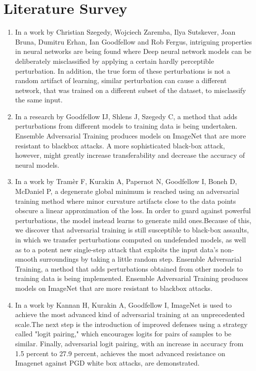 \documentclass[ 12pt,a4paper,twocolumn,fleqn]{article}
\begin{document}
\section{Literature Survey}
\begin{enumerate}
    \item In a work by Christian Szegedy, Wojciech Zaremba, Ilya Sutskever, Joan Bruna, Dumitru Erhan, Ian Goodfellow and Rob Fergus, intriguing properties in neural networks are being found where Deep neural network models can be deliberately misclassified by applying a certain hardly perceptible perturbation. In addition, the true form of these perturbations is not a random artifact of learning, similar perturbation can cause a different network, that was trained on a different subset of the dataset, to misclassify the same input.
    \item In a research by Goodfellow IJ, Shlens J, Szegedy C, a method that adds perturbations from different models to training data is being undertaken. Ensemble Adversarial Training produces models on ImageNet that are more resistant to blackbox attacks. A more sophisticated black-box attack, however, might greatly increase transferability and decrease the accuracy of neural models.
    \item In a work by Tramèr F, Kurakin A, Papernot N, Goodfellow I, Boneh D, McDaniel P, a degenerate global minimum is reached using an adversarial training method where minor curvature artifacts close to the data points obscure a linear approximation of the loss. In order to guard against powerful perturbations, the model instead learns to generate mild ones.Because of this, we discover that adversarial training is still susceptible to black-box assaults, in which we transfer perturbations computed on undefended models, as well as to a potent new single-step attack that exploits the input data's non-smooth surroundings by taking a little random step. Ensemble Adversarial Training, a method that adds perturbations obtained from other models to training data is being implemented. Ensemble Adversarial Training produces models on ImageNet that are more resistant to blackbox attacks.
    \item In a work by Kannan H, Kurakin A, Goodfellow I, ImageNet is used  to achieve the most advanced kind of adversarial training at an unprecedented scale.The next step is the introduction of improved defenses using a strategy called "logit pairing," which encourages logits for pairs of samples to be similar. Finally, adversarial logit pairing, with an increase in accuracy from 1.5 percent to 27.9 percent, achieves the most advanced resistance on Imagenet against PGD white box attacks, are demonstrated.

\end{enumerate}
\end{document}
